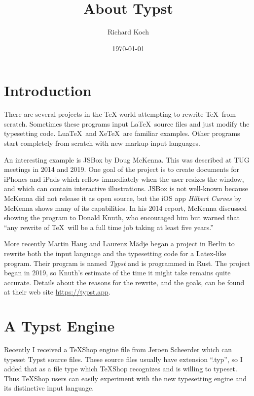 \documentclass[11pt, oneside]{article}   	%
\title{About Typst}
\author{Richard Koch}
\date{\today}							%
\begin{document}
\maketitle

\section{Introduction} 
There are several projects in the TeX world attempting to rewrite \TeX\ from scratch. Sometimes  these programs input \LaTeX\ source files and just modify the typesetting code. Lua\TeX\ and Xe\TeX\ are familiar examples. Other programs start completely from scratch with new markup input languages. 

An interesting example is JSBox by Doug McKenna. This was described at TUG meetings in 2014 and 2019. One goal of the project is to create documents for iPhones and iPads which reflow immediately when the user resizes the window, and which can contain interactive illustrations. JSBox is not well-known because McKenna did not release it as open source, but the iOS app {\em Hilbert Curves} by McKenna shows many of its capabilities. In his 2014 report, McKenna discussed showing the program to Donald Knuth, who encouraged him but warned that ``any rewrite of \TeX\ will be a full time job taking at least five years.''

More recently Martin Haug and Laurenz Mädje began a project in Berlin to rewrite both the input language and the typesetting code for a Latex-like program.  Their program is named {\em Typst} and is programmed in Rust. The project began in 2019, so Knuth's estimate of the time it might take remains quite accurate. Details about the reasons for the rewrite, and the goals, can be found at their web site \url{https://typst.app}. 

\section{A Typst Engine} 
Recently I received a TeXShop engine file from Jeroen Scheerder which can typeset Typst
source files. These source files usually have extension ``.typ'', so I added that as a file type which TeXShop
recognizes and is willing to typeset. Thus TeXShop users can easily experiment with the new typesetting
engine and its distinctive input language.
\end{document}

